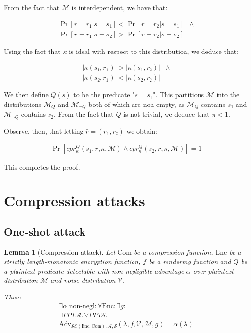 \documentclass[conference, letterpaper, 10pt]{IEEEtran}
\newtheorem{lemma}{Lemma}
\begin{document}
\begin{IEEEproof}

From the fact that $\bar{\mathcal{M}}$ is interdependent, we have that:

\begin{align*}
    \Pr[r = r_1|s = s_1] < \Pr[r = r_2|s = s_1]&\land\\
    \Pr[r = r_1|s = s_2] > \Pr[r = r_2|s = s_2]&
\end{align*}

Using the fact that $\kappa$ is ideal with respect to this distribution,
we deduce that:

\begin{align*}
    |\kappa(s_1, r_1)| > |\kappa(s_1, r_2)|&\land\\
    |\kappa(s_2, r_1)| < |\kappa(s_2, r_2)|&
\end{align*}

We then define $Q(s)$ to be the predicate "$s = s_1$". This partitions
$\mathcal{M}$ into the distributions $\mathcal{M}_Q$ and
$\mathcal{M}_{\lnot Q}$ both of which are non-empty, as $\mathcal{M}_Q$
contains $s_1$ and $\mathcal{M}_{\lnot Q}$ contains $s_2$. From the fact that
$Q$ is not trivial, we deduce that $\pi < 1$.

Observe, then, that letting $\bar{r} = (r_1, r_2)$ we obtain:

\begin{align*}
    \Pr[cpr^Q_{\kappa}(s_1, \bar{r}, \kappa, \mathcal{M})
    \land
    cpr^Q_{\kappa}(s_2, \bar{r}, \kappa, \mathcal{M})] = 1
\end{align*}

This completes the proof.

\end{IEEEproof}

\section{Compression attacks}\label{sec:comattack}

\subsection{One-shot attack}

\begin{lemma}[Compression attack]

Let $\textrm{Com}$ be a compression function, $\textrm{Enc}$ be a strictly length-monotonic
encryption function, $f$ be a rendering function and $Q$ be a plaintext
predicate detectable with non-negligible advantage $\alpha$ over plaintext
distribution $\mathcal{M}$ and noise distribution $\mathcal{V}$.

Then:
\begin{align*}
    \exists \alpha \text{ non-negl}:
    \forall \textrm{Enc}:
    \exists g:\\
    \exists PPT \mathcal{A}:
    \forall PPT \mathcal{S}:\\
    \text{Adv}_{\mathcal{SE}(\textrm{Enc}, \textrm{Com}), \mathcal{A}, \mathcal{S}}
    (\lambda, f, \mathcal{V}, \mathcal{M}, g) = \alpha(\lambda)
\end{align*}

\end{lemma}
\end{document}
